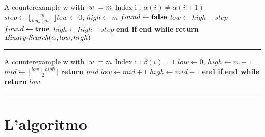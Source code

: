 \begin{minipage}{0.48\textwidth}
\captionsetup{format=ruled,labelfont=bf}
 \label{alg:par}
   
    \begin{algorithmic}[0]
    \small
\Statex
\Input A counterexample w with $\lvert w\rvert=m$
\Output Index i : $\alpha(i) \neq \alpha(i+1)$
\State $step \gets \lfloor \frac{m}{log_{2}(m)} \rfloor low \gets 0,\, high \gets m$
\State $found \gets \text{\textbf{false}}$
\State $low \gets high-step$
\State $found \gets \text{\textbf{true}}$
\State {}
\Else
\State $high \gets high-step$
\EndIf
\EndWhile
\State \textbf{\quad\:\:end if}
\State \textbf{end while}
\State \textbf{return} $\text{\textit{Binary-Search}}(\alpha,low,high)$


\end{algorithmic}

  \kern2pt\hrule height.8pt\relax
\end{minipage}%
\hfill
\begin{minipage}{0.50\textwidth}
\captionsetup{format=ruled,labelfont=bf}
  \label{alg:eag}
  
    
    \begin{algorithmic}[0]
     \small
\Statex
\Input A counterexample w with $\lvert w\rvert=m$
\Output Index i : $\beta(i)=1$
\State $low \gets 0,\: high \gets m-1$
\State $mid\gets \lfloor \frac {low+high}{2} \rfloor$
\State \textbf{return} $mid$
\State $low \gets mid+1$
\Else
\State $high \gets mid-1$
\EndIf
\EndWhile
\State \textbf{\quad\:\:end if}
\State \textbf{end while}
\State \textbf{return} $low$
\end{algorithmic}
  
  \kern2pt\hrule height.8pt\relax
\end{minipage}
\section{L'algoritmo}
